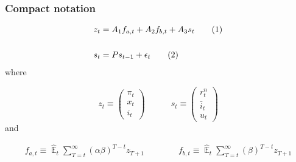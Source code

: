 \documentclass{beamer}
\DeclareMathOperator{\E}{\mathbb{E}}
\newcommand\numberthis{\addtocounter{equation}{1}\tag{\theequation}} %
\begin{document}
\begin{frame}
	\frametitle{Compact notation}
	\label{compact}

 \begin{align*}
z_t & = A_1 f_{a,t} + A_2 f_{b,t} + A_3 s_t \label{LOM_LR} \numberthis \\
\\
s_t & = P s_{t-1} + \epsilon_t \label{exog} \numberthis
\end{align*}
where

\begin{equation}
 z_t \equiv \begin{pmatrix} \pi_t \\ x_t \\ i_t
 \end{pmatrix} 
 \quad \quad \quad 
  s_t  \equiv \begin{pmatrix} r_t^n \\ \bar{i}_t \\ u_t 
 \end{pmatrix} 
\end{equation}
and

  \begin{align}
f_{a,t}  \equiv  \hat{\E}_t\sum_{T=t}^{\infty} (\alpha\beta)^{T-t } z_{T+1} \quad \quad \quad \quad f_{b,t}  \equiv \hat{\E}_t\sum_{T=t}^{\infty} (\beta)^{T-t } z_{T+1} \label{fafb}
\end{align}

\hyperlink{NK}{}	


\end{frame}
%
%
%
\end{document}
